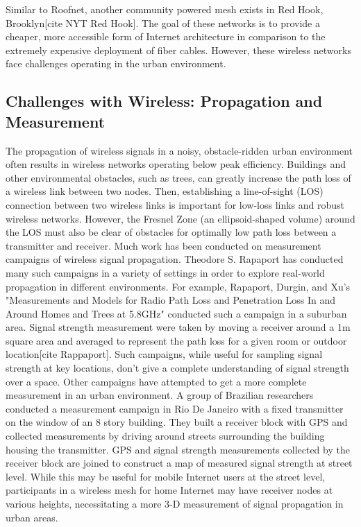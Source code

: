 \documentclass[pageno]{jpaper}
\begin{document}
Similar to Roofnet, another community powered mesh exists in Red Hook, Brooklyn[cite NYT Red Hook]. The goal of these networks is to provide a cheaper, more accessible form of Internet architecture in comparison to the extremely expensive deployment of fiber cables. However, these wireless networks face challenges operating in the urban environment.

\subsection{Challenges with Wireless: Propagation and Measurement}
The propagation of wireless signals in a noisy, obstacle-ridden urban environment often results in wireless networks operating below peak efficiency. Buildings and other environmental obstacles, such as trees, can greatly increase the path loss of a wireless link between two nodes. Then, establishing a line-of-sight (LOS) connection between two wireless links is important for low-loss links and robust wireless networks. However, the Fresnel Zone (an ellipsoid-shaped volume) around the LOS must also be clear of obstacles for optimally low path loss between a transmitter and receiver. 
Much work has been conducted on measurement campaigns of wireless signal propagation. Theodore S. Rapaport has conducted many such campaigns in a variety of settings in order to explore real-world propagation in different environments. For example, Rapaport, Durgin, and Xu's "Measurements and Models for Radio Path Loss and Penetration Loss In and Around Homes and Trees at 5.8GHz" conducted such a campaign in a suburban area. Signal strength measurement were taken by moving a receiver around a 1m square area and averaged to represent the path loss for a given room or outdoor location[cite Rappaport]. Such campaigns, while useful for sampling signal strength at key locations, don't give a complete understanding of signal strength over a space. 
Other campaigns have attempted to get a more complete measurement in an urban environment. A group of Brazilian researchers conducted a measurement campaign in Rio De Janeiro with a fixed transmitter on the window of an 8 story building. They built a receiver block with GPS and collected measurements by driving around streets surrounding the building housing the transmitter. GPS and signal strength measurements collected by the receiver block are joined to construct a map of measured signal strength at street level. While this may be useful for mobile Internet users at the street level, participants in a wireless mesh for home Internet may have receiver nodes at various heights, necessitating a more 3-D measurement of signal propagation in urban areas. 
\end{document}
